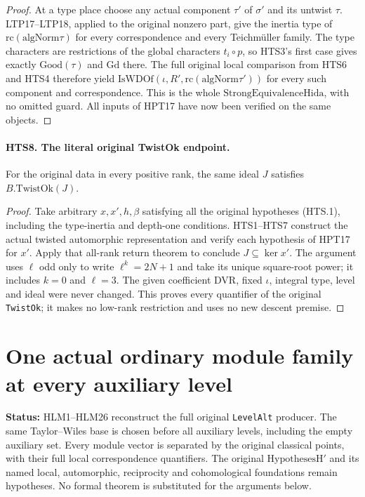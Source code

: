 \documentclass[11pt,a4paper]{article}
\numberwithin{equation}{section}
\theoremstyle{remark}\newtheorem{remark}[theorem]{Remark}
\newcommand{\status}[1]{\textbf{Status:} #1}
\begin{document}
\begin{proof}
At a type place choose any actual component $\tau'$ of
$\sigma'$ and its untwist $\tau$.  LTP17--LTP18, applied to
the original nonzero part, give the inertia type of
$\mathrm{rc}(\mathrm{algNorm}\tau)$ for every correspondence
and every Teichm\"uller family.  The type characters are
restrictions of the global characters $t_i\circ p$, so HTS3's
first case gives exactly $\mathrm{Good}(\tau)$ and
$\mathrm{Gd}$ there.  The full original local comparison
from HTS6 and HTS4 therefore yield
$\mathrm{IsWDOf}(\iota,R',\mathrm{rc}(\mathrm{algNorm}\tau'))$
for every such component and correspondence.  This is the
whole $\mathrm{StrongEquivalenceHida}$, with no omitted guard.
All inputs of HPT17 have now been verified on the same objects.
\end{proof}

\paragraph{HTS8. The literal original TwistOk endpoint.}
\label{claim:HTS8}
For the original data in every positive rank, the same ideal
$J$ satisfies $B.\mathrm{TwistOk}(J)$.
\begin{proof}
Take arbitrary $x,x',h,\beta$ satisfying all the original
hypotheses (HTS.1), including the type-inertia and depth-one
conditions.  HTS1--HTS7 construct the actual twisted automorphic
representation and verify each hypothesis of HPT17 for $x'$.
Apply that all-rank return theorem to conclude
$J\subseteq\ker x'$.  The argument uses $\ell$ odd only to
write $\ell^k=2N+1$ and take its unique square-root power;
it includes $k=0$ and $\ell=3$.  The given coefficient DVR,
fixed $\iota$, integral type, level and ideal were never changed.
This proves every quantifier of the original \texttt{Twist\allowbreak Ok};
it makes no low-rank restriction and uses no new descent premise.
\end{proof}


\section{One actual ordinary module family at every auxiliary level}
\label{sec:hida-level-modules-v45}

\status{HLM1--HLM26 reconstruct the full original \texttt{Level\allowbreak Alt}
producer.  The same Taylor--Wiles base is chosen before all auxiliary
levels, including the empty auxiliary set.  Every module vector is
separated by the original classical points, with their full local
correspondence quantifiers.  The original \(\mathrm{HypothesesH}'\)
and its named local, automorphic, reciprocity and cohomological
foundations remain hypotheses.  No formal theorem is substituted
for the arguments below.}
\end{document}
